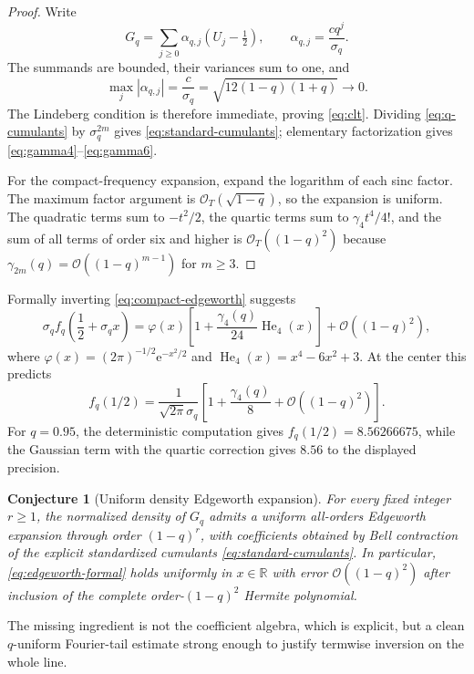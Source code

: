 \documentclass[11pt,oneside]{article}
\newtheorem{conjecture}[theorem]{Conjecture}
\theoremstyle{definition}
\theoremstyle{remark}
\newcommand{\R}{\mathbb R}
\newcommand{\e}{\mathrm e}
\newcommand{\bigO}{\mathcal O}
\newcommand{\He}{\operatorname{He}}
\begin{document}
\begin{proof}
Write
\[
 G_q=\sum_{j\ge0}\alpha_{q,j}(U_j-\tfrac12),
 \qquad
 \alpha_{q,j}=\frac{cq^j}{\sigma_q}.
\]
The summands are bounded, their variances sum to one, and
\[
 \max_j|\alpha_{q,j}|=\frac{c}{\sigma_q}
 =\sqrt{12(1-q)(1+q)}\longrightarrow0.
\]
The Lindeberg condition is therefore immediate, proving \eqref{eq:clt}.
Dividing \eqref{eq:q-cumulants} by $\sigma_q^{2m}$ gives
\eqref{eq:standard-cumulants}; elementary factorization gives
\eqref{eq:gamma4}--\eqref{eq:gamma6}.

For the compact-frequency expansion, expand the logarithm of each sinc factor.  The maximum
factor argument is $\bigO_T(\sqrt{1-q})$, so the expansion is uniform.  The quadratic terms
sum to $-t^2/2$, the quartic terms sum to $\gamma_4t^4/4!$, and the sum of all terms of order
six and higher is $\bigO_T((1-q)^2)$ because
$\gamma_{2m}(q)=\bigO((1-q)^{m-1})$ for $m\ge3$.
\end{proof}

Formally inverting \eqref{eq:compact-edgeworth} suggests
\begin{equation}
 \sigma_q f_q\!\left(\frac12+\sigma_qx\right)
 =\varphi(x)\left[1+\frac{\gamma_4(q)}{24}\He_4(x)\right]
 +\bigO((1-q)^2),                                            \label{eq:edgeworth-formal}
\end{equation}
where
\(
 \varphi(x)=(2\pi)^{-1/2}\e^{-x^2/2}
\)
and $\He_4(x)=x^4-6x^2+3$.
At the center this predicts
\begin{equation}
 f_q(1/2)
 =\frac{1}{\sqrt{2\pi}\sigma_q}
  \left[1+\frac{\gamma_4(q)}8+\bigO((1-q)^2)\right].        \label{eq:center-edgeworth}
\end{equation}
For $q=0.95$, the deterministic computation gives $f_q(1/2)=8.56266675$, while the Gaussian
term with the quartic correction gives $8.56$ to the displayed precision.

\begin{conjecture}[Uniform density Edgeworth expansion]
\label{conj:edgeworth}
For every fixed integer $r\ge1$, the normalized density of $G_q$ admits a uniform all-orders
Edgeworth expansion through order $(1-q)^r$, with coefficients obtained by Bell contraction
of the explicit standardized cumulants \eqref{eq:standard-cumulants}.  In particular,
\eqref{eq:edgeworth-formal} holds uniformly in $x\in\R$ with error
$\bigO((1-q)^2)$ after inclusion of the complete order-$(1-q)^2$ Hermite polynomial.
\end{conjecture}

The missing ingredient is not the coefficient algebra, which is explicit, but a clean
$q$-uniform Fourier-tail estimate strong enough to justify termwise inversion on the whole
line.
\end{document}
